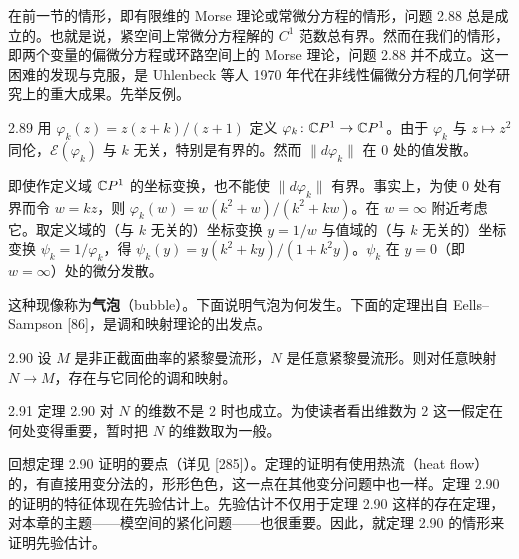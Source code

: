 
在前一节的情形，即有限维的 Morse 理论或常微分方程的情形，问题 2.88 总是成立的。也就是说，紧空间上常微分方程解的 $C^1$ 范数总有界。然而在我们的情形，即两个变量的偏微分方程或环路空间上的 Morse 理论，问题 2.88 并不成立。这一困难的发现与克服，是 Uhlenbeck 等人 1970 年代在非线性偏微分方程的几何学研究上的重大成果。先举反例。

\begin{example}{2.89}
  用 $\varphi_k(z)=z(z+k)/(z+1)$ 定义 $\varphi_k\colon\mathbb{C} P^1\to\mathbb{C} P^1$。由于 $\varphi_k$ 与 $z\mapsto z^2$ 同伦，$\mathcal{E}(\varphi_k)$ 与 $k$ 无关，特别是有界的。然而 $\|d\varphi_k\|$ 在 $0$ 处的值发散。

  即使作定义域 $\mathbb{C} P^1$ 的坐标变换，也不能使 $\|d\varphi_k\|$ 有界。事实上，为使 $0$ 处有界而令 $w=kz$，则 $\varphi_k(w)=w(k^2+w)/(k^2+kw)$。在 $w=\infty$ 附近考虑它。取定义域的（与 $k$ 无关的）坐标变换 $y=1/w$ 与值域的（与 $k$ 无关的）坐标变换 $\psi_k=1/\varphi_k$，得 $\psi_k(y)=y(k^2+ky)/(1+k^2y)$。$\psi_k$ 在 $y=0$（即 $w=\infty$）处的微分发散。
\end{example}


这种现像称为\textbf{气泡}（bubble）。下面说明气泡为何发生。下面的定理出自 Eells–Sampson [86]，是调和映射理论的出发点。

\begin{theorem}{2.90}
  设 $M$ 是非正截面曲率的紧黎曼流形，$N$ 是任意紧黎曼流形。则对任意映射 $N\to M$，存在与它同伦的调和映射。
\end{theorem}

\begin{remark}{2.91}
  定理 2.90 对 $N$ 的维数不是 $2$ 时也成立。为使读者看出维数为 $2$ 这一假定在何处变得重要，暂时把 $N$ 的维数取为一般。
\end{remark}

回想定理 2.90 证明的要点（详见 [285]）。定理的证明有使用热流（heat flow）的，有直接用变分法的，形形色色，这一点在其他变分问题中也一样。定理 2.90 的证明的特征体现在先验估计上。先验估计不仅用于定理 2.90 这样的存在定理，对本章的主题——模空间的紧化问题——也很重要。因此，就定理 2.90 的情形来证明先验估计。

